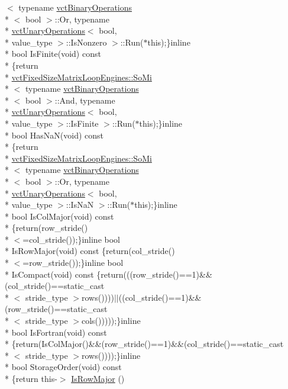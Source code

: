 \begin{DoxyCompactItemize}
$<$ typename \hyperlink{classvct_binary_operations}{vct\-Binary\-Operations}\\*
$<$ bool $>$\-::Or, typename \\*
\hyperlink{classvct_unary_operations}{vct\-Unary\-Operations}$<$ bool, \\*
value\-\_\-type $>$\-::Is\-Nonzero $>$\-::Run($\ast$this);\}inline \\*
bool Is\-Finite(void) const \\*
\{return \\*
\hyperlink{classvct_fixed_size_matrix_loop_engines_1_1_so_mi}{vct\-Fixed\-Size\-Matrix\-Loop\-Engines\-::\-So\-Mi}\\*
$<$ typename \hyperlink{classvct_binary_operations}{vct\-Binary\-Operations}\\*
$<$ bool $>$\-::And, typename \\*
\hyperlink{classvct_unary_operations}{vct\-Unary\-Operations}$<$ bool, \\*
value\-\_\-type $>$\-::Is\-Finite $>$\-::Run($\ast$this);\}inline \\*
bool Has\-Na\-N(void) const \\*
\{return \\*
\hyperlink{classvct_fixed_size_matrix_loop_engines_1_1_so_mi}{vct\-Fixed\-Size\-Matrix\-Loop\-Engines\-::\-So\-Mi}\\*
$<$ typename \hyperlink{classvct_binary_operations}{vct\-Binary\-Operations}\\*
$<$ bool $>$\-::Or, typename \\*
\hyperlink{classvct_unary_operations}{vct\-Unary\-Operations}$<$ bool, \\*
value\-\_\-type $>$\-::Is\-Na\-N $>$\-::Run($\ast$this);\}inline \\*
bool Is\-Col\-Major(void) const \\*
\{return(row\-\_\-stride()\\*
$<$=col\-\_\-stride());\}inline bool \\*
Is\-Row\-Major(void) const \{return(col\-\_\-stride()\\*
$<$=row\-\_\-stride());\}inline bool \\*
Is\-Compact(void) const \{return(((row\-\_\-stride()==1)\&\&(col\-\_\-stride()==static\-\_\-cast\\*
$<$ stride\-\_\-type $>$rows())))$\vert$$\vert$((col\-\_\-stride()==1)\&\&(row\-\_\-stride()==static\-\_\-cast\\*
$<$ stride\-\_\-type $>$cols()))));\}inline \\*
bool Is\-Fortran(void) const \\*
\{return(Is\-Col\-Major()\&\&(row\-\_\-stride()==1)\&\&(col\-\_\-stride()==static\-\_\-cast\\*
$<$ stride\-\_\-type $>$rows())));\}inline \\*
bool Storage\-Order(void) const \\*
\{return this-\/$>$ \hyperlink{classvct_fixed_size_const_matrix_base_a64b85bf8f9e125a4b174129907dccdee}{Is\-Row\-Major} ()
\end{DoxyCompactItemize}
